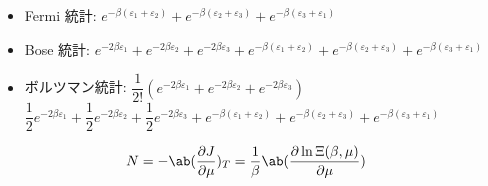 \documentclass[uplatex,diffipdfmx,a4paper,11pt]{jlreq}
\theoremstyle{definition}
\begin{document}
\begin{itemize}
  \item Fermi 統計: $e^{-\beta(\varepsilon_1 + \varepsilon_2)} + e^{-\beta(\varepsilon_2 + \varepsilon_3)} + e^{-\beta(\varepsilon_3 + \varepsilon_1)}$
  \item Bose 統計: $e^{-2\beta\varepsilon_1} + e^{-2\beta\varepsilon_2} + e^{-2\beta\varepsilon_3} + e^{-\beta(\varepsilon_1 + \varepsilon_2)} + e^{-\beta(\varepsilon_2 + \varepsilon_3)} + e^{-\beta(\varepsilon_3 + \varepsilon_1)}$
  \item ボルツマン統計: $\dfrac{1}{2!}(e^{-2\beta\varepsilon_1} + e^{-2\beta\varepsilon_2} + e^{-2\beta\varepsilon_3})$ \\
        $\dfrac{1}{2}e^{-2\beta\varepsilon_1} + \dfrac{1}{2}e^{-2\beta\varepsilon_2} + \dfrac{1}{2}e^{-2\beta\varepsilon_3} + e^{-\beta(\varepsilon_1 + \varepsilon_2)} + e^{-\beta(\varepsilon_2 + \varepsilon_3)} + e^{-\beta(\varepsilon_3 + \varepsilon_1)}$
\end{itemize}

\begin{align}
  N & = -\ab(\diffp{J}{\mu})_T = \frac{1}{\beta}\ab(\diffp{\ln\Xi(\beta,\mu)}{\mu})
\end{align}
\end{document}
